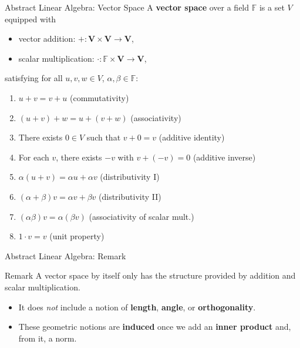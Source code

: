 \blueheader
\begin{frame}{Abstract Linear Algebra: Vector Space}
A \textbf{vector space} over a field $\mathbb{F}$ is a set $V$ equipped with
\begin{itemize}
    \item vector addition: $\boldsymbol{+: V \times V \to V}$,
    \item scalar multiplication: $\boldsymbol{\cdot: \mathbb{F} \times V \to V}$,
\end{itemize}
satisfying for all $u,v,w \in V$, $\alpha,\beta \in \mathbb{F}$:
\begin{enumerate}
    \item $u+v = v+u$ \hfill (commutativity)
    \item $(u+v)+w = u+(v+w)$ \hfill (associativity)
    \item There exists $0 \in V$ such that $v+0=v$ \hfill (additive identity)
    \item For each $v$, there exists $-v$ with $v+(-v)=0$ \hfill (additive inverse)
    \item $\alpha(u+v) = \alpha u + \alpha v$ \hfill (distributivity I)
    \item $(\alpha+\beta) v = \alpha v + \beta v$ \hfill (distributivity II)
    \item $(\alpha\beta)v = \alpha(\beta v)$ \hfill (associativity of scalar mult.)
    \item $1 \cdot v = v$ \hfill (unit property)
\end{enumerate}
\end{frame}

\redheader
\begin{frame}{Abstract Linear Algebra: Remark}
\begin{redbox*}{Remark}
A vector space by itself only has the structure provided by addition and scalar multiplication.

\medskip
\begin{itemize}
    \item It does \emph{not} include a notion of \textbf{length}, \textbf{angle}, or \textbf{orthogonality}.
    \item These geometric notions are \textbf{induced} once we add an \textbf{inner product} and, from it, a norm.
\end{itemize}
\end{redbox*}
\end{frame}

